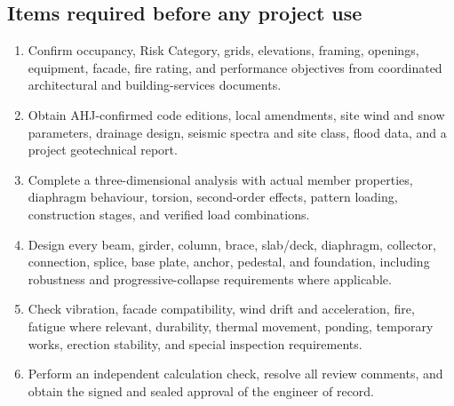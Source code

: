 \subsection{Items required before any project use}
\begin{enumerate}
  \item Confirm occupancy, Risk Category, grids, elevations, framing, openings,
    equipment, facade, fire rating, and performance objectives from coordinated
    architectural and building-services documents.
  \item Obtain AHJ-confirmed code editions, local amendments, site wind and snow
    parameters, drainage design, seismic spectra and site class, flood data, and a
    project geotechnical report.
  \item Complete a three-dimensional analysis with actual member properties,
    diaphragm behaviour, torsion, second-order effects, pattern loading, construction
    stages, and verified load combinations.
  \item Design every beam, girder, column, brace, slab/deck, diaphragm, collector,
    connection, splice, base plate, anchor, pedestal, and foundation, including
    robustness and progressive-collapse requirements where applicable.
  \item Check vibration, facade compatibility, wind drift and acceleration, fire,
    fatigue where relevant, durability, thermal movement, ponding, temporary works,
    erection stability, and special inspection requirements.
  \item Perform an independent calculation check, resolve all review comments, and
    obtain the signed and sealed approval of the engineer of record.
\end{enumerate}

